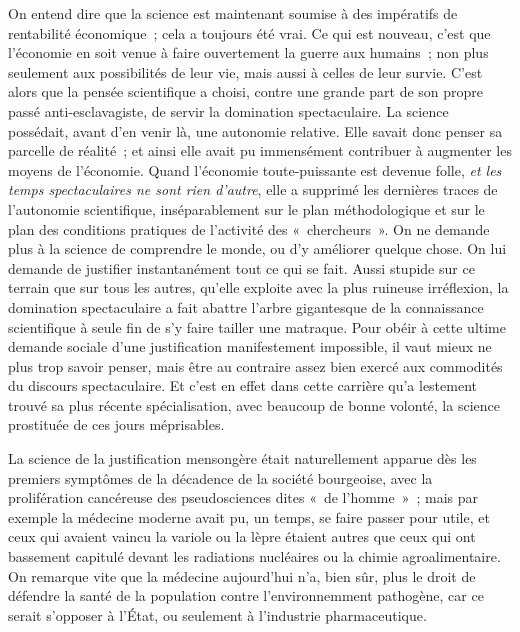 \documentclass[french,twoside]{book} %
\begin{document}
\noindent On entend dire que la science est maintenant soumise à des impératifs de rentabilité économique ; cela a toujours été vrai. Ce qui est nouveau, c’est que l’économie en soit venue à faire ouvertement la guerre aux humains ; non plus seulement aux possibilités de leur vie, mais aussi à celles de leur survie. C’est alors que la pensée scientifique a choisi, contre une grande part de son propre passé anti-esclavagiste, de servir la domination spectaculaire. La science possédait, avant d’en venir là, une autonomie relative. Elle savait donc penser sa parcelle de réalité ; et ainsi elle avait pu immensément contribuer à augmenter les moyens de l’économie. Quand l’économie toute-puissante est devenue folle, \emph{et les temps spectaculaires ne sont rien d’autre}, elle a supprimé les dernières traces de l’autonomie scientifique, inséparablement sur le plan méthodologique et sur le plan des conditions pratiques de l’activité des « chercheurs ». On ne demande plus à la science de comprendre le monde, ou d’y améliorer quelque chose. On lui demande de justifier instantanément tout ce qui se fait. Aussi stupide sur ce terrain que sur tous les autres, qu’elle exploite avec la plus ruineuse irréflexion, la domination spectaculaire a fait abattre l’arbre gigantesque de la connaissance scientifique à seule fin de s’y faire tailler une matraque. Pour obéir à cette ultime demande sociale d’une justification manifestement impossible, il vaut mieux ne plus trop savoir penser, mais être au contraire assez bien exercé aux commodités du discours spectaculaire. Et c’est en effet dans cette carrière qu’a lestement trouvé sa plus récente spécialisation, avec beaucoup de bonne volonté, la science prostituée de ces jours méprisables.\par
La science de la justification mensongère était naturellement apparue dès les premiers symptômes de la décadence de la société bourgeoise, avec la prolifération cancéreuse des pseudosciences dites « de l’homme » ; mais par exemple la médecine moderne avait pu, un temps, se faire passer pour utile, et ceux qui avaient vaincu la variole ou la lèpre étaient autres que ceux qui ont bassement capitulé devant les radiations nucléaires ou la chimie agroalimentaire. On remarque vite que la médecine aujourd’hui n’a, bien sûr, plus le droit de défendre la santé de la population contre l’environnemment pathogène, car ce serait s’opposer à l’État, ou seulement à l’industrie pharmaceutique.\par
\end{document}
